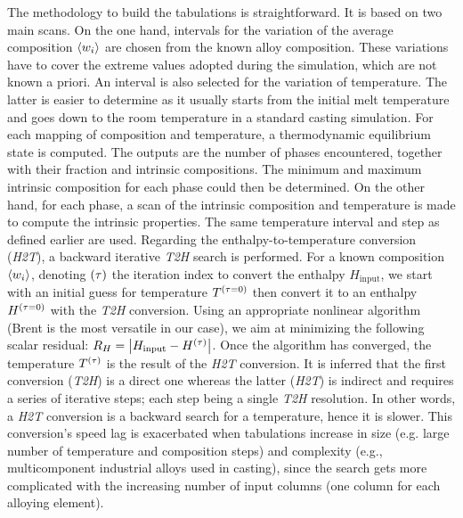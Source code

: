 %
The methodology to build the tabulations is straightforward. It is based on two main scans. On the one hand, intervals for the variation of the 
average composition $\left \langle w_i \right \rangle$ are chosen from the known alloy composition. These variations have to cover the extreme values adopted during the 
simulation, which are not known a priori. An interval is also selected for the variation of temperature. The latter is easier to determine as it
usually starts from the initial melt temperature and goes down to the room temperature in a standard casting simulation. For each mapping of
composition and temperature, a thermodynamic equilibrium state is computed. The outputs are the 
number of phases encountered, together with their fraction and intrinsic compositions. The minimum and maximum intrinsic composition for each phase 
could then be determined. On the other hand, for each phase, a scan of the intrinsic composition and temperature is made to compute the intrinsic 
properties. The same temperature interval and step as defined earlier are used.
Regarding the enthalpy-to-temperature conversion (\emph{H2T}), a backward iterative \emph{T2H} search is performed. 
For a known composition $\left \langle w_i \right \rangle$, denoting ${\left( \tau \right)}$ the iteration index to convert the enthalpy 
$H_{\text{input}}$, we start with an initial guess for temperature $T^{{\left( \tau=0 \right)}}$ then convert it to an 
enthalpy $H^{{\left( \tau=0 \right)}}$ with the \emph{T2H} conversion. Using an appropriate nonlinear algorithm (Brent is the most versatile 
in our case), we aim at minimizing the following scalar residual: $R_{H} = \left | H_{\text{input}} - H^{{\left( \tau \right)}}  \right |$. 
Once the algorithm has converged, the temperature $T^{{\left( \tau \right)}}$ is the result of the \emph{H2T} conversion. It is 
inferred that the first conversion (\emph{T2H}) is a direct one whereas the latter (\emph{H2T}) is indirect and requires 
a series of iterative steps; each step being a single \emph{T2H} resolution. In other words, a \emph{H2T} conversion is a 
backward search for a temperature, hence it is slower. This conversion's speed lag is exacerbated when tabulations 
increase in size (e.g. large number of temperature and composition steps) and complexity (e.g., multicomponent 
industrial alloys used in casting), since the search gets more complicated with the increasing number of input 
columns (one column for each alloying element).
%
%
